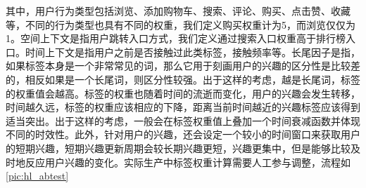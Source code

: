     其中，用户行为类型包括浏览、添加购物车、搜索、评论、购买、点击赞、收藏等，不同的行为类型也具有不同的权重，我们定义购买权重计为5，而浏览仅仅为1。空间上下文是指用户跳转入口方式，我们定义通过搜索入口权重高于排行榜入口。时间上下文是指用户之前是否接触过此类标签，接触频率等。长尾因子是指，如果标签本身是一个非常常见的词，那么它用于刻画用户的兴趣的区分性是比较差的，相反如果是一个长尾词，则区分性较强。出于这样的考虑，越是长尾词，标签的权重值会越高。标签的权重也随着时间的流逝而变化，用户的兴趣会发生转移，时间越久远，标签的权重应该相应的下降，距离当前时间越近的兴趣标签应该得到适当突出。出于这样的考虑，一般会在标签权重值上叠加一个时间衰减函数并体现不同的时效性。此外，针对用户的兴趣，还会设定一个较小的时间窗口来获取用户的短期兴趣，短期兴趣更新周期会较长期兴趣更短，兴趣更集中，但是能够比较及时地反应用户兴趣的变化。实际生产中标签权重计算需要人工参与调整，流程如\autoref{pic:hl_abtest}
    \begin{figure}
    \centering
      \label{pic:hl_abtest}
    \end{figure}


